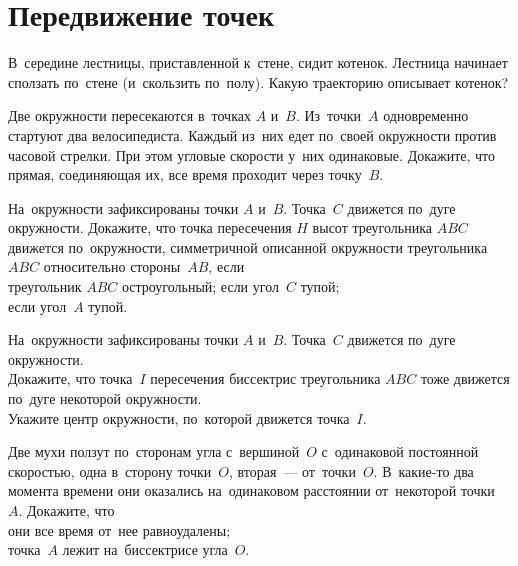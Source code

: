 
\section*{Передвижение точек}


\begin{problems}

\item
В~середине лестницы, приставленной к~стене, сидит котенок.
Лестница начинает сползать по~стене (и~скользить по~полу).
Какую траекторию описывает котенок?

\item
Две окружности пересекаются в~точках $A$ и~$B$.
Из~точки~$A$ одновременно стартуют два велосипедиста.
Каждый из~них едет по~своей окружности против часовой стрелки.
При этом угловые скорости у~них одинаковые.
Докажите, что прямая, соединяющая их, все время проходит через точку~$B$.

\item
На~окружности зафиксированы точки $A$ и~$B$.
Точка~$C$ движется по~дуге окружности.
Докажите, что точка пересечения $H$ высот треугольника $ABC$ движется
по~окружности, симметричной описанной окружности треугольника $ABC$
относительно стороны~$AB$, если
\\
\subproblem треугольник $ABC$ остроугольный;
\qquad
\subproblem если угол~$C$ тупой;
\\
\subproblem если угол~$A$ тупой.

\item
На~окружности зафиксированы точки $A$ и~$B$.
Точка~$C$ движется по~дуге окружности.
\\
\subproblem
Докажите, что точка~$I$ пересечения биссектрис треугольника $ABC$ тоже движется
по~дуге некоторой окружности.
\\
\subproblem
Укажите центр окружности, по~которой движется точка~$I$.

\item
Две мухи ползут по~сторонам угла с~вершиной~$O$ с~одинаковой постоянной
скоростью, одна в~сторону точки~$O$, вторая~--- от~точки~$O$.
В~какие-то два момента времени они оказались на~одинаковом расстоянии
от~некоторой точки~$A$.
Докажите, что
\\
\subproblem
они все время от~нее равноудалены;
\\
\subproblem
точка~$A$ лежит на~биссектрисе угла~$O$.


\end{problems}
